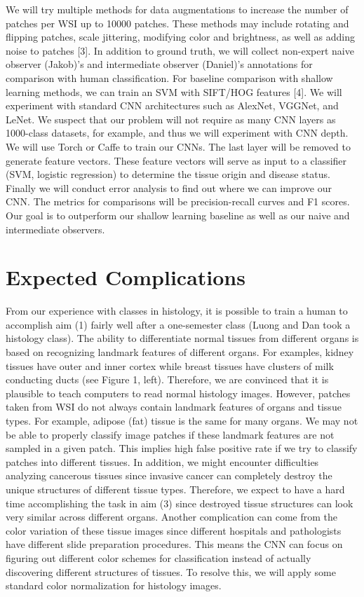 \documentclass[10pt,twocolumn,letterpaper]{article}
\begin{document}
We will try multiple methods for data augmentations to increase the number of patches per WSI up to 10000 patches. These methods may include rotating and flipping patches, scale jittering, modifying color and brightness, as well as adding noise to patches [3]. In addition to ground truth, we will collect non-expert naive observer (Jakob)’s and intermediate observer (Daniel)’s annotations for comparison with human classification. For baseline comparison with shallow learning methods, we can train an SVM with SIFT/HOG features [4]. We will experiment with standard CNN architectures such as AlexNet, VGGNet, and LeNet. We suspect that our problem will not require as many CNN layers as 1000-class datasets, for example, and thus we will experiment with CNN depth. We will use Torch or Caffe to train our CNNs. The last layer will be removed to generate feature vectors. These feature vectors will serve as input to a classifier (SVM, logistic regression) to determine the tissue origin and disease status. Finally we will conduct error analysis to find out where we can improve our CNN. The metrics for comparisons will be precision-recall curves and F1 scores. Our goal is to outperform our shallow learning baseline as well as our naive and intermediate observers. 

\section{Expected Complications}
\label{sec:Expected Complications}

From our experience with classes in histology, it is possible to train a human to accomplish aim (1) fairly well after a one-semester class (Luong and Dan took a histology class). The ability to differentiate normal tissues from different organs is based on recognizing landmark features of different organs. For examples, kidney tissues have outer and inner cortex while breast tissues have clusters of milk conducting ducts (see Figure 1, left). Therefore, we are convinced that it is plausible to teach computers to read normal histology images. However, patches taken from WSI do not always contain landmark features of organs and tissue types. For example, adipose (fat) tissue is the same for many organs. We may not be able to properly classify image patches if these landmark features are not sampled in a given patch. This implies high false positive rate if we try to classify patches into different tissues. In addition, we might encounter difficulties analyzing cancerous tissues since invasive cancer can completely destroy the unique structures of different tissue types. Therefore, we expect to have a hard time accomplishing the task in aim (3) since destroyed tissue structures can look very similar across different organs. Another complication can come from the color variation of these tissue images since different hospitals and pathologists have different slide preparation procedures. This means the CNN can focus on figuring out different color schemes for classification instead of actually discovering different structures of tissues. To resolve this, we will apply some standard color normalization for histology images. 
\end{document}
